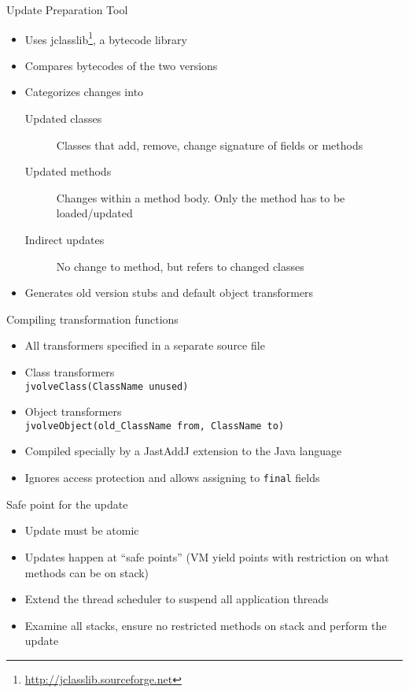 \begin{frame}[t,fragile,label=offline]{Update Preparation Tool}%
\vspace{-2ex}
\vspace{-2ex}
\begin{itemize}
\item Uses jclasslib\footnote{\url{http://jclasslib.sourceforge.net}}, a
bytecode library
\item Compares bytecodes of the two versions
\item Categorizes changes into
  \begin{description}
  \item[Updated classes] Classes that add, remove, change signature of fields
                       or methods
  \item[Updated methods] Changes within a method body. Only the method has
                        to be loaded/updated
  \item[Indirect updates] No change to method, but refers to changed
                          classes
  \end{description}
\item Generates old version stubs and default object transformers
\end{itemize}
\end{frame}

\begin{frame}[t,fragile]{Compiling transformation functions}%
\begin{itemize}
\item All transformers specified in a separate source file
\item Class transformers  \\ \hspace{6ex} {\footnotesize {\tt jvolveClass(ClassName unused)}}
\item Object transformers \\ \hspace{6ex} {\footnotesize {\tt jvolveObject(old\_ClassName from, ClassName to)}}
\item Compiled specially by a JastAddJ extension to the Java language
\item Ignores access protection and allows assigning to {\tt final} fields
\end{itemize}
\end{frame}

\begin{frame}[t,fragile,label=suspend]{Safe point for the update}%
\begin{itemize}
\item Update must be atomic
\item Updates happen at ``safe points'' (VM yield points with restriction
      on what methods can be on stack)
\item Extend the thread scheduler to suspend all application threads
\item Examine all stacks, ensure no restricted methods on stack and perform
      the update
\end{itemize}
\end{frame}

